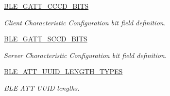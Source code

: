 \begin{DoxyCompactItemize}
\hyperlink{group___b_l_e___g_a_t_t___c_c_c_d___b_i_t_s}{B\+L\+E\+\_\+\+G\+A\+T\+T\+\_\+\+C\+C\+C\+D\+\_\+\+B\+I\+TS}
\begin{DoxyCompactList}\small\item\em Client Characteristic Configuration bit field definition. \end{DoxyCompactList}\item 
\hyperlink{group___b_l_e___g_a_t_t___s_c_c_d___b_i_t_s}{B\+L\+E\+\_\+\+G\+A\+T\+T\+\_\+\+S\+C\+C\+D\+\_\+\+B\+I\+TS}
\begin{DoxyCompactList}\small\item\em Server Characteristic Configuration bit field definition. \end{DoxyCompactList}\item 
\hyperlink{group___b_l_e___a_t_t___u_u_i_d___l_e_n_g_t_h___t_y_p_e_s}{B\+L\+E\+\_\+\+A\+T\+T\+\_\+\+U\+U\+I\+D\+\_\+\+L\+E\+N\+G\+T\+H\+\_\+\+T\+Y\+P\+ES}
\begin{DoxyCompactList}\small\item\em B\+LE A\+TT U\+U\+ID lengths. \end{DoxyCompactList}\end{DoxyCompactItemize}
